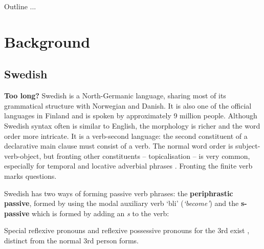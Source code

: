 \documentclass[runningheads,a4paper]{llncs}
\begin{document}
Outline ...

\section{Background}

\subsection{Swedish}

\textbf{Too long?}
Swedish is a North-Germanic language, sharing most of its grammatical structure 
with Norwegian and Danish. It is also one of the official languages in Finland
and is spoken by approximately 9 million people.
Although Swedish syntax often is similar to English, the  morphology is richer and the
word order more intricate.
It is a verb-second language: the
second constituent of a declarative main clause must consist of a verb.
The normal word order is subject-verb-object, but fronting other constituents
-- topicalisation -- is very common,  especially for temporal and
locative adverbial phrases \cite[]{H&H}.
Fronting the finite verb marks questions.

Swedish has two ways of forming passive verb phrases: the 
\textbf{periphrastic passive}, formed by using the modal auxiliary verb `bli' (\emph{`become'})
and the \textbf{s-passive} which is formed by adding an \emph{s} to the verb: \\
\label{gfPass:s-pass}

Special reflexive pronouns and reflexive possessive pronouns for the 3rd
exist \cite[ \& 319]{H&H}, distinct from the normal 3rd person forms.
\end{document}
